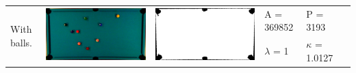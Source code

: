 \begin{tabular}{|l|c|c|l|l|c|}
\multirow{2}{*}{With balls.} & \multirow{2}{*}{\includegraphics[scale=0.05]{../images/1/1_img.png}} & \multirow{2}{*}{\includegraphics[scale=0.05]{../images/1/1_mask.png}} & A = 369852 & P = 3193 & \multirow{2}{*}{}\\ 
& & & $\lambda$ = 1 & $\kappa$ = 1.0127 & \\
\hline


\end{tabular}
